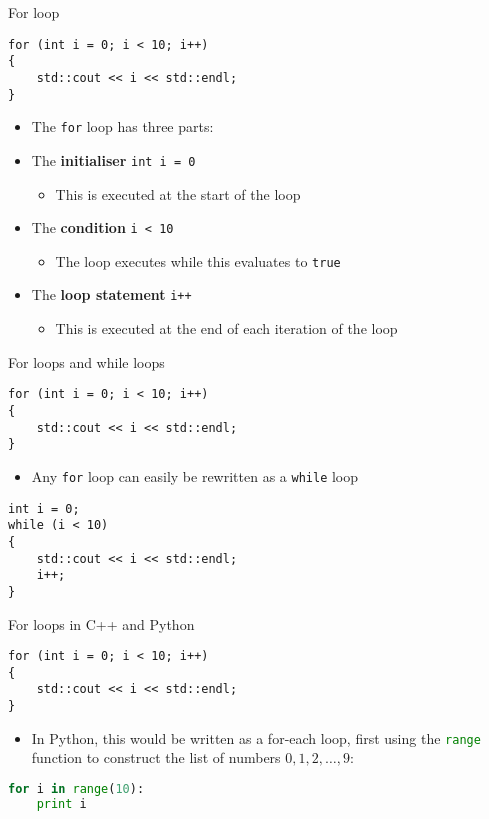\begin{frame}[fragile]{For loop}
	\begin{lstlisting}
for (int i = 0; i < 10; i++)
{
    std::cout << i << std::endl;
}
	\end{lstlisting}
	\pause
    \begin{itemize}
        \item The \lstinline{for} loop has three parts: \pause
        \item The \textbf{initialiser} \lstinline{int i = 0}
        \begin{itemize}
            \item This is executed at the start of the loop
        \end{itemize} \pause
        \item The \textbf{condition} \lstinline{i < 10}
        \begin{itemize}
            \item The loop executes while this evaluates to \lstinline{true}
        \end{itemize} \pause
        \item The \textbf{loop statement} \lstinline{i++}
        \begin{itemize}
            \item This is executed at the end of each iteration of the loop
        \end{itemize}
    \end{itemize}
\end{frame}

\begin{frame}[fragile]{For loops and while loops}
	\begin{lstlisting}
for (int i = 0; i < 10; i++)
{
    std::cout << i << std::endl;
}
	\end{lstlisting}
    \begin{itemize}
        \item Any \lstinline{for} loop can easily be rewritten as a \lstinline{while} loop
    \end{itemize}
    \pause
	\begin{lstlisting}
int i = 0;
while (i < 10)
{
    std::cout << i << std::endl;
    i++;
}
	\end{lstlisting}
\end{frame}

\begin{frame}[fragile]{For loops in C++ and Python}
	\begin{lstlisting}
for (int i = 0; i < 10; i++)
{
    std::cout << i << std::endl;
}
	\end{lstlisting}
    \begin{itemize}
        \item In Python, this would be written as a for-each loop, first using the \lstinline[language=Python]{range} function
        to construct the list of numbers $0, 1, 2, \dots, 9$:
    \end{itemize}
	\begin{lstlisting}[language=Python]
for i in range(10):
    print i
	\end{lstlisting}
\end{frame}

